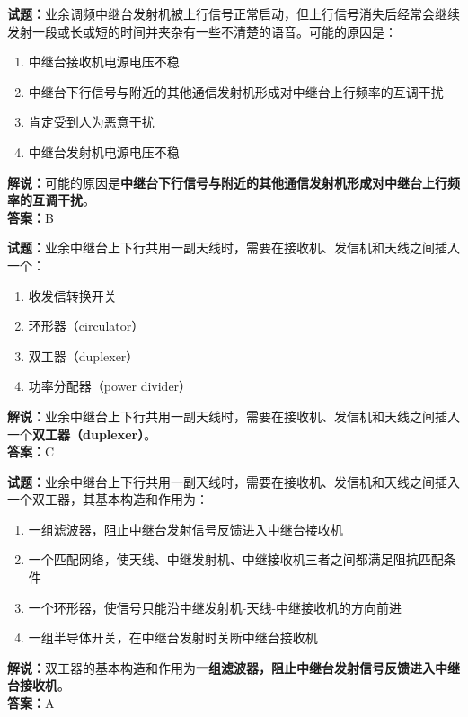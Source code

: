 \documentclass{ctexbook}
\begin{document}
\bigskip


\noindent\textbf{试题：}业余调频中继台发射机被上行信号正常启动，但上行信号消失后经常会继续发射一段或长或短的时间并夹杂有一些不清楚的语音。可能的原因是：
\begin{enumerate}[leftmargin=3em]
\item 中继台接收机电源电压不稳
\item 中继台下行信号与附近的其他通信发射机形成对中继台上行频率的互调干扰
\item 肯定受到人为恶意干扰
\item 中继台发射机电源电压不稳
\end{enumerate}
\noindent\textbf{解说：}可能的原因是\textbf{中继台下行信号与附近的其他通信发射机形成对中继台上行频率的互调干扰}。\\\noindent\textbf{答案：}B




\bigskip


\noindent\textbf{试题：}业余中继台上下行共用一副天线时，需要在接收机、发信机和天线之间插入一个：
\begin{enumerate}[leftmargin=3em]
\item 收发信转换开关
\item 环形器（circulator）
\item 双工器（duplexer）
\item 功率分配器（power divider）
\end{enumerate}
\noindent\textbf{解说：}业余中继台上下行共用一副天线时，需要在接收机、发信机和天线之间插入一个\textbf{双工器（duplexer）}。\\\noindent\textbf{答案：}C



\bigskip


\noindent\textbf{试题：}业余中继台上下行共用一副天线时，需要在接收机、发信机和天线之间插入一个双工器，其基本构造和作用为：
\begin{enumerate}[leftmargin=3em]
\item 一组滤波器，阻止中继台发射信号反馈进入中继台接收机
\item 一个匹配网络，使天线、中继发射机、中继接收机三者之间都满足阻抗匹配条件
\item 一个环形器，使信号只能沿中继发射机-天线-中继接收机的方向前进
\item 一组半导体开关，在中继台发射时关断中继台接收机
\end{enumerate}
\noindent\textbf{解说：}双工器的基本构造和作用为\textbf{一组滤波器，阻止中继台发射信号反馈进入中继台接收机}。\\\noindent\textbf{答案：}A
\end{document}
